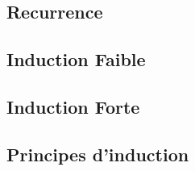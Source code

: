 \subsection{Recurrence}\label{subsec:recurrence}

\subsection{Induction Faible}\label{subsec:inductionfaible}

\subsection{Induction Forte}\label{subsec:inductionforte}
\subsection{Principes d'induction}\label{subsec:principesdinduction}